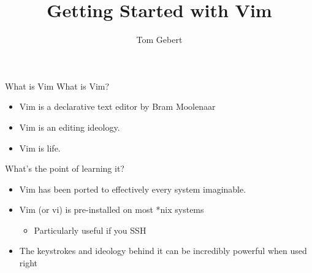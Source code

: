 \documentclass{beamer}
\title{Getting Started with Vim}
\author{Tom Gebert}
\begin{document}
\frame{\titlepage}
\begin{frame} {What is Vim}
	What is Vim? 
	\begin{itemize}
		\item Vim is a declarative text editor by Bram Moolenaar
		\item Vim is an editing ideology. 
		\item Vim is life. 
	\end{itemize}
	What's the point of learning it? 
	\begin{itemize}
		\item Vim has been ported to effectively every system imaginable. 
		\item Vim (or vi) is pre-installed on most *nix systems \begin{itemize} 
		   \item Particularly useful if you SSH
		\end{itemize}
		\item The keystrokes and ideology behind it can be incredibly powerful when used right
	\end{itemize}

\end{frame}
\end{document}
